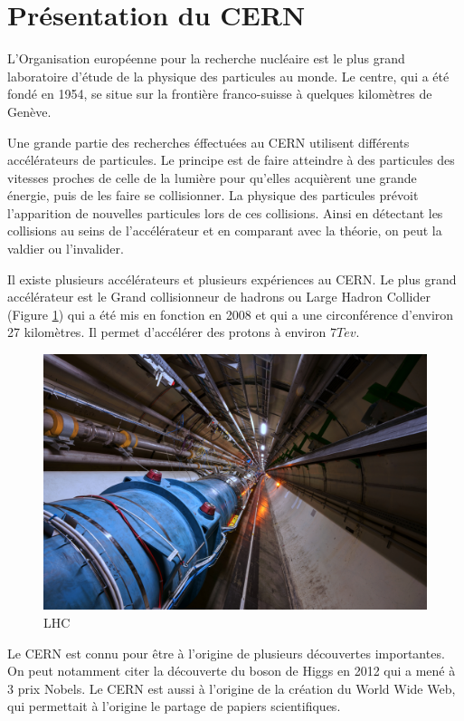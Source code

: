 \documentclass[a4paper]{report}
\begin{document}
    \section{Présentation du CERN}
        L'Organisation européenne pour la recherche nucléaire est le plus grand laboratoire d'étude de la physique des particules au monde.
        Le centre, qui a été fondé en 1954, se situe sur la frontière franco-suisse à quelques kilomètres de Genève.

        Une grande partie des recherches éffectuées au CERN utilisent différents accélérateurs de particules.
        Le principe est de faire atteindre à des particules des vitesses proches de celle de la lumière pour qu'elles acquièrent une grande énergie, puis de les faire se collisionner.
        La physique des particules prévoit l'apparition de nouvelles particules lors de ces collisions.
        Ainsi en détectant les collisions au seins de l'accélérateur et en comparant avec la théorie, on peut la valdier ou l'invalider.

        Il existe plusieurs accélérateurs et plusieurs expériences au CERN.
        Le plus grand accélérateur est le Grand collisionneur de hadrons ou Large Hadron Collider (Figure \ref{LHC}) qui a été mis en fonction en 2008 et qui a une circonférence d'environ 27 kilomètres.
        Il permet d'accélérer des protons à environ $7 Tev$.

        \begin{figure}[!htb]
            \includegraphics[width=\textwidth, center]{LHC.jpg}
            \caption{LHC}
            \label{LHC}
        \end{figure}

        Le CERN est connu pour être à l'origine de plusieurs découvertes importantes.
        On peut notamment citer la découverte du boson de Higgs en 2012 qui a mené à 3 prix Nobels.
        Le CERN est aussi à l'origine de la création du World Wide Web, qui permettait à l'origine le partage de papiers scientifiques.
\end{document}
